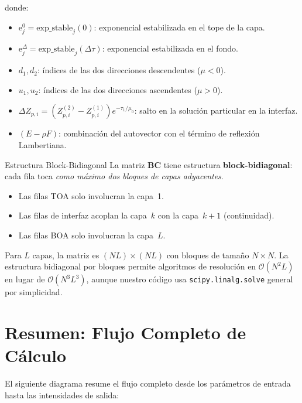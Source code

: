 \documentclass[a4paper,11pt]{article}
\begin{document}
\noindent donde:
\begin{itemize}
\item $\text{e}_j^0 = \text{exp\_stable}_j(0)$: exponencial estabilizada en el tope de la capa.
\item $\text{e}_j^\Delta = \text{exp\_stable}_j(\Delta\tau)$: exponencial estabilizada en el fondo.
\item $d_1, d_2$: \'indices de las dos direcciones descendentes ($\mu < 0$).
\item $u_1, u_2$: \'indices de las dos direcciones ascendentes ($\mu > 0$).
\item $\Delta Z_{p,i} = (Z_{p,i}^{(2)} - Z_{p,i}^{(1)}) e^{-\tau_1/\mu_0}$: salto en la soluci\'on particular en la interfaz.
\item $(E - \rho F)$: combinaci\'on del autovector con el t\'ermino de reflexi\'on Lambertiana.
\end{itemize}

\begin{concept}{Estructura Block-Bidiagonal}
La matriz $\mathbf{BC}$ tiene estructura \textbf{block-bidiagonal}: cada fila toca \textit{como m\'aximo dos bloques de capas adyacentes}.
\begin{itemize}
\item Las filas TOA solo involucran la capa~1.
\item Las filas de interfaz acoplan la capa~$k$ con la capa~$k+1$ (continuidad).
\item Las filas BOA solo involucran la capa~$L$.
\end{itemize}
Para $L$ capas, la matriz es $(NL) \times (NL)$ con bloques de tama\~no $N \times N$.  La estructura bidiagonal por bloques permite algoritmos de resoluci\'on en $\mathcal{O}(N^2 L)$ en lugar de $\mathcal{O}(N^3 L^3)$, aunque nuestro c\'odigo usa \texttt{scipy.linalg.solve} general por simplicidad.
\end{concept}

\section{Resumen: Flujo Completo de C\'alculo}
\label{sec:summary}

El siguiente diagrama resume el flujo completo desde los par\'ametros de entrada hasta las intensidades de salida:
\end{document}
